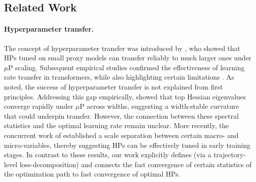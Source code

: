 \documentclass{article} %
\begin{document}
\vspace{-1.25mm}
\subsection{Related Work}\label{sec:related_work}
\vspace{-1.mm}

\paragraph{Hyperparameter transfer.}
The concept of hyperparameter transfer was introduced by \cite{yang2022tensor}, who showed that HPs tuned on small proxy models can transfer reliably to much larger ones under $\mu$P scaling. Subsequent empirical studies confirmed the effectiveness of learning rate transfer in transformers, while also highlighting certain limitations \cite{lingle2024empirical, vlassis2025thorough}. As \cite{yang2022tensor} noted, the success of hyperparameter transfer is not explained from first principles. Addressing this gap empirically, \cite{noci2024super} showed that top Hessian eigenvalues converge rapidly under $\mu$P across widths, suggesting a width-stable curvature that could underpin transfer. However, the connection between these spectral statistics and the optimal learning rate remain unclear. More recently, the concurrent work of  \cite{hong2025provable} established a scale separation between certain macro- and micro-variables, thereby suggesting HPs can be effectively tuned in early training stages. 
In contrast to these results, 
our work explicitly defines (via a trajectory-level loss-decomposition) and connects the fast convergence of certain statistics of the optimization path to fast convergence of optimal HPs. 
\end{document}
